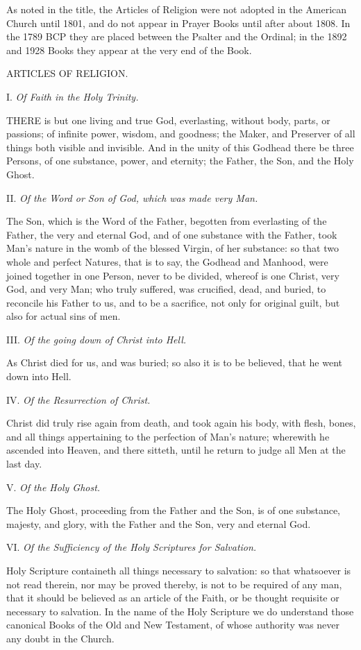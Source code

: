 As
noted in the title, the Articles of Religion were not adopted in the
American Church until 1801, and do not appear in Prayer Books until
after about 1808. In the 1789 BCP they are placed between the Psalter
and the Ordinal; in the 1892 and 1928 Books they appear at the very
end of the Book.

ARTICLES OF RELIGION.

I.
\emph{Of Faith in the Holy Trinity.}

THERE
is but one living and true God, everlasting, without body, parts, or passions;
of infinite power, wisdom, and goodness; the Maker, and Preserver of all
things both visible and invisible. And in the unity of this Godhead there
be three Persons, of one substance, power, and eternity; the Father, the
Son, and the Holy Ghost.

II.
\emph{Of the Word or Son of God, which was made very Man.}

The
Son, which is the Word of the Father, begotten from everlasting of the
Father, the very and eternal God, and of one substance with the Father,
took Man's nature in the womb of the blessed Virgin, of her substance:
so that two whole and perfect Natures, that is to say, the Godhead and
Manhood, were joined together in one Person, never to be divided, whereof
is one Christ, very God, and very Man; who truly suffered, was crucified,
dead, and buried, to reconcile his Father to us, and to be a sacrifice,
not only for original guilt, but also for actual sins of men.

III.
\emph{Of the going down of Christ into Hell.}

As
Christ died for us, and was buried; so also it is to be believed, that
he went down into Hell.

IV.
\emph{Of the Resurrection of Christ.}

Christ
did truly rise again from death, and took again his body, with flesh,
bones, and all things appertaining to the perfection of Man’s nature;
wherewith he ascended into Heaven, and there sitteth, until he return
to judge all Men at the last day.

V.
\emph{Of the Holy Ghost.}

The
Holy Ghost, proceeding from the Father and the Son, is of one substance,
majesty, and glory, with the Father and the Son, very and eternal God.

VI.
\emph{Of the Sufficiency of the Holy Scriptures for Salvation.}

Holy
Scripture containeth all things necessary to salvation: so that whatsoever
is not read therein, nor may be proved thereby, is not to be required
of any man, that it should be believed as an article of the Faith, or
be thought requisite or necessary to salvation. In the name of the Holy
Scripture we do understand those canonical Books of the Old and New Testament,
of whose authority was never any doubt in the Church.

